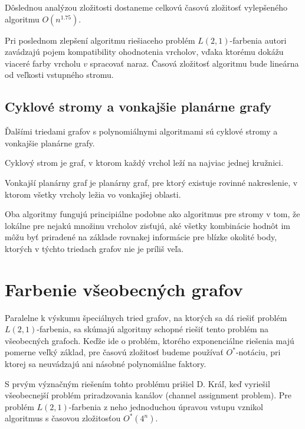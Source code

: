 Dôslednou analýzou 
zložitosti dostaneme celkovú časovú zložitosť vylepšeného algoritmu $O(n^{1.75})$\cite{chang_kuo_improv}.

Pri poslednom zlepšení algoritmu riešiaceho problém $L(2,1)$-farbenia autori zavádzajú
pojem kompatibility ohodnotenia vrcholov, vďaka ktorému dokážu viaceré farby vrcholu $v$
spracovať naraz. Časová zložitosť algoritmu bude lineárna od veľkosti vstupného stromu\cite{chang_kuo_linear}.

\subsection{Cyklové stromy a vonkajšie planárne grafy}

Ďalšími triedami grafov s polynomiálnymi algoritmami sú cyklové stromy\cite{kaktusy} a vonkajšie
planárne grafy\cite{outer_planar}.

\begin{defn}
    Cyklový strom je graf, v ktorom každý vrchol leží na najviac jednej kružnici.
\end{defn}

\begin{defn}
    Vonkajší planárny graf je planárny graf, pre ktorý existuje rovinné nakreslenie, v ktorom
    všetky vrcholy ležia vo vonkajšej oblasti.
\end{defn}

Oba algoritmy fungujú principiálne podobne ako algoritmus pre stromy v tom, že lokálne pre
nejakú množinu vrcholov zisťujú, aké všetky kombinácie hodnôt im môžu byť priradené na
základe rovnakej informácie pre blízke okolité body, ktorých v týchto triedach grafov nie je
príliš veľa.

\section{Farbenie všeobecných grafov}

Paralelne k výskumu špeciálnych tried grafov, na ktorých sa dá riešiť problém $L(2,1)$-farbenia,
sa skúmajú algoritmy schopné riešiť tento problém na všeobecných grafoch. Keďže ide o problém,
ktorého exponenciálne riešenia majú pomerne veľký základ, pre časovú zložitosť budeme používať
$O^*$-notáciu, pri ktorej sa neuvádzajú ani násobné polynomiálne faktory.

S prvým význačným riešením tohto problému prišiel D. Kráľ, keď vyriešil všeobecnejší problém
priradzovania kanálov (channel assignment problem). Pre problém $L(2,1)$-farbenia z neho 
jednoduchou úpravou vstupu vznikol algoritmus s časovou zložitosťou $O^*(4^n)$\cite{kral_channel}.

